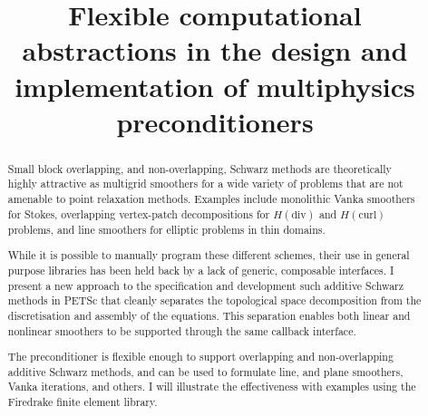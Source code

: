 \title{Flexible computational abstractions in the design and
  implementation of multiphysics preconditioners}


\begin{abstract}
  Small block overlapping, and non-overlapping, Schwarz methods are
  theoretically highly attractive as multigrid smoothers for a wide
  variety of problems that are not amenable to point relaxation
  methods. Examples include monolithic Vanka smoothers for Stokes,
  overlapping vertex-patch decompositions for $H(\text{div})$ and
  $H(\text{curl})$ problems, and line smoothers for elliptic problems
  in thin domains.

  While it is possible to manually program these different schemes,
  their use in general purpose libraries has been held back by a lack
  of generic, composable interfaces. I present a new approach to the
  specification and development such additive Schwarz methods in PETSc
  that cleanly separates the topological space decomposition from the
  discretisation and assembly of the equations. This separation
  enables both linear and nonlinear smoothers to be supported through
  the same callback interface.

  The preconditioner is flexible enough to support overlapping and
  non-overlapping additive Schwarz methods, and can be used to
  formulate line, and plane smoothers, Vanka iterations, and others. I
  will illustrate the effectiveness with examples using the Firedrake
  finite element library.
\end{abstract}
